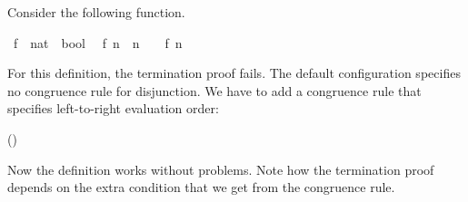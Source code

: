 \begin{isabellebody}
\begin{isamarkuptext}
  Consider the following function.%
\end{isamarkuptext}%
\isamarkuptrue%
\isamarkupfalse%
\ f\ {\isacharcolon}{\isacharcolon}\ {\isachardoublequoteopen}nat\ {\isasymRightarrow}\ bool{\isachardoublequoteclose}\isanewline
{}\isanewline
\ \ {\isachardoublequoteopen}f\ n\ {\isacharequal}\ {\isacharparenleft}n\ {\isacharequal}\ {}\ {\isasymor}\ f\ {\isacharparenleft}n\ {\isacharminus}\ {}{\isacharparenright}{\isacharparenright}{\isachardoublequoteclose}%
\isadelimproof
%
\endisadelimproof
%
\isatagproof
%
\endisatagproof
{\isafoldproof}%
%
\isadelimproof
%
\endisadelimproof
%
\begin{isamarkuptext}%
For this definition, the termination proof fails. The default configuration
  specifies no congruence rule for disjunction. We have to add a
  congruence rule that specifies left-to-right evaluation order:

  \vspace{1ex}
  \noindent {}\hfill()
  \vspace{1ex}

  Now the definition works without problems. Note how the termination
  proof depends on the extra condition that we get from the congruence
  rule.


\end{isamarkuptext}
\end{isabellebody}

